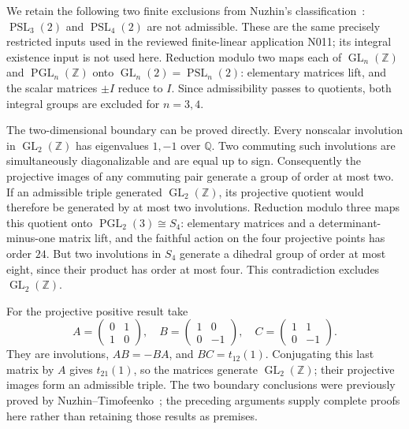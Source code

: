 \documentclass[11pt,a4paper]{article}
\newcommand{\GL}{\operatorname{GL}}\newcommand{\SL}{\operatorname{SL}}
\newcommand{\PGL}{\operatorname{PGL}}\newcommand{\PSL}{\operatorname{PSL}}
\begin{document}
We retain the following two finite exclusions from Nuzhin's
classification~\cite{N90}: $\PSL_3(2)$ and $\PSL_4(2)$ are not
admissible. These are the same precisely restricted inputs used in
the reviewed finite-linear application N011; its integral existence
input is not used here. Reduction modulo two maps each of
$\GL_n(\mathbb Z)$ and $\PGL_n(\mathbb Z)$ onto
$\GL_n(2)=\PSL_n(2)$: elementary matrices lift, and the scalar matrices
$\pm I$ reduce to $I$. Since admissibility passes to quotients, both
integral groups are excluded for $n=3,4$.

The two-dimensional boundary can be proved directly. Every nonscalar
involution in $\GL_2(\mathbb Z)$ has eigenvalues $1,-1$ over
$\mathbb Q$. Two commuting such involutions are simultaneously
diagonalizable and are equal up to sign. Consequently the projective
images of any commuting pair generate a group of order at most two.
If an admissible triple generated $\GL_2(\mathbb Z)$, its projective
quotient would therefore be generated by at most two involutions.
Reduction modulo three maps this quotient onto
$\PGL_2(3)\cong S_4$: elementary matrices and a determinant-minus-one
matrix lift, and the faithful action on the four projective points
has order $24$. But two involutions in $S_4$ generate a dihedral group
of order at most eight, since their product has order at most four.
This contradiction excludes $\GL_2(\mathbb Z)$.

For the projective positive result take
\[
 A=\begin{pmatrix}0&1\\1&0\end{pmatrix},\quad
 B=\begin{pmatrix}1&0\\0&-1\end{pmatrix},\quad
 C=\begin{pmatrix}1&1\\0&-1\end{pmatrix}.                 \tag{2}
\]
They are involutions, $AB=-BA$, and $BC=t_{12}(1)$.
Conjugating this last matrix by $A$ gives $t_{21}(1)$, so the matrices
generate $\GL_2(\mathbb Z)$; their projective images form an
admissible triple. The two boundary conclusions were previously
proved by Nuzhin--Timofeenko~\cite{NT}; the preceding arguments supply
complete proofs here rather than retaining those results as premises.
\end{document}
